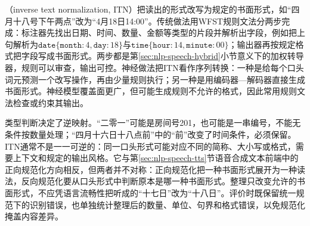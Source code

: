 （inverse text normalization, ITN）把读出的形式改写为规定的书面形式，如“四月十八号下午两点”改为“4月18日14:00”。传统做法用WFST规则文法分两步完成：标注器先找出日期、时间、数量、金额等类型的片段并解析出字段，例如把上句解析为$\texttt{date}\{\texttt{month}{:}4,\texttt{day}{:}18\}$与$\texttt{time}\{\texttt{hour}{:}14,\texttt{minute}{:}00\}$；输出器再按规定格式把字段写成书面形式。两步都是第\ref{sec:nlp-speech-hybrid}小节意义下的加权转导器，规则可以审查，输出可控。神经做法把ITN看作序列转换：一种是给每个口头词元预测一个改写操作，再由少量规则执行；另一种是用编码器—解码器直接生成书面形式。神经模型覆盖面更广，但可能生成规则不允许的格式，因此常用规则文法检查或约束其输出。

类型判断决定了逆映射。“二零一”可能是房间号201，也可能是一串编号，不能无条件按数量处理；“四月十六日十八点前”中的“前”改变了时间条件，必须保留。ITN通常不是一一可逆的：同一口头形式可能对应不同的简称、大小写或格式，需要上下文和规定的输出风格。它与第\ref{sec:nlp-speech-tts}节语音合成文本前端中的正向规范化方向相反，但两者并不对称：正向规范化把一种书面形式展开为一种读法，反向规范化要从口头形式中判断原本是哪一种书面形式。整理只改变允许的书面形式，不应凭语言流畅性把听成的“十七日”改为“十八日”。评价时既保留统一规范下的识别错误，也单独统计整理后的数量、单位、句界和格式错误，以免规范化掩盖内容差异。
